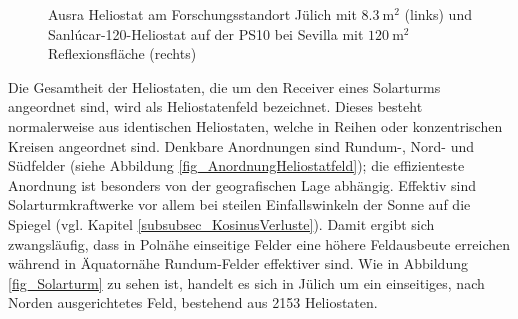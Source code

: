 \begin{figure}[h!]
    \centering
    \setlength{\fboxsep}{1pt}
    \setlength{\fboxrule}{1pt}
\caption[Ausra Heliostat am Forschungsstandort Jülich mit $\SI{8.3}{\metre\squared}$  und Sanlúcar-120-Heliostat auf der PS10 bei Sevilla mit $\SI{120}{\metre\squared}$ Reflexionsfläche]{Ausra Heliostat am Forschungsstandort Jülich mit $\SI{8.3}{\metre\squared}$  (links) und Sanlúcar-120-Heliostat auf der PS10 bei Sevilla mit $\SI{120}{\metre\squared}$ Reflexionsfläche (rechts) \cite[S.13]{DissBelhomme}}
    \label{fig_DarstellungHeliostat}
\end{figure}

Die Gesamtheit der Heliostaten, die um den Receiver eines Solarturms angeordnet sind, wird als Heliostatenfeld bezeichnet.
Dieses besteht normalerweise aus identischen Heliostaten, welche in Reihen oder konzentrischen Kreisen angeordnet sind.
Denkbare Anordnungen sind Rundum-, Nord- und Südfelder (siehe Abbildung \ref{fig_AnordnungHeliostatfeld}); die effizienteste Anordnung ist besonders von der geografischen Lage abhängig.
Effektiv sind Solarturmkraftwerke vor allem bei steilen Einfallswinkeln der Sonne auf die Spiegel (vgl. Kapitel \ref{subsubsec_KosinusVerluste}).
Damit ergibt sich zwangsläufig, dass in Polnähe einseitige Felder  eine höhere Feldausbeute erreichen während in Äquatornähe Rundum-Felder effektiver sind.
Wie in Abbildung \ref{fig_Solarturm} zu sehen ist, handelt es sich in Jülich um ein einseitiges, nach Norden ausgerichtetes Feld, bestehend aus 2153 Heliostaten.


